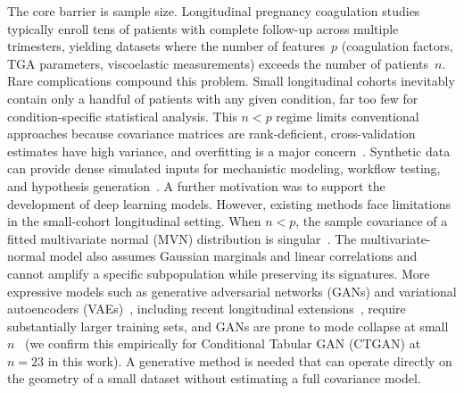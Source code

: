 The core barrier is sample size. Longitudinal pregnancy coagulation studies
typically enroll tens of patients with complete follow-up across multiple trimesters,
yielding datasets where the number of features~$p$ (coagulation factors, TGA
parameters, viscoelastic measurements) exceeds the number of patients~$n$. Rare
complications compound this problem. Small longitudinal cohorts inevitably contain
only a handful of patients with any given condition, far too few for
condition-specific statistical analysis. This $n < p$ regime limits conventional
approaches because covariance matrices are rank-deficient, cross-validation
estimates have high variance, and overfitting is a major concern~\citep{Hastie2009}. Synthetic data can
provide dense simulated inputs for mechanistic modeling, workflow testing, and hypothesis
generation~\citep{Gonzales2023,Kuhnel2024}. A further motivation was to support the
development of deep learning models. However, existing methods face
limitations in the small-cohort longitudinal setting. When $n < p$, the sample covariance of a fitted
multivariate normal (MVN) distribution is singular~\citep{Ledoit2004}.
The multivariate-normal model also assumes Gaussian marginals and linear correlations and
cannot amplify a specific subpopulation while preserving
its signatures. More expressive models such as generative adversarial networks (GANs) and
variational autoencoders (VAEs)~\citep{Goodfellow2014,Kingma2014,Xu2019CTGAN}, including recent longitudinal
extensions~\citep{Kuhnel2024}, require substantially larger training sets, and GANs are
prone to mode collapse at small $n$~\citep{DeMitri2025} (we confirm this empirically for Conditional Tabular GAN (CTGAN) at
$n{=}23$ in this work). A generative method is needed that can operate
directly on the geometry of a small dataset without estimating a full
covariance model.

